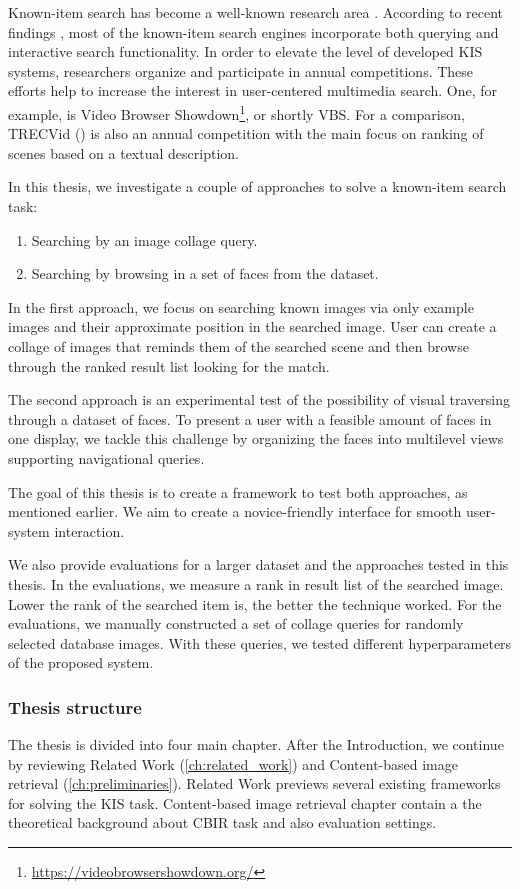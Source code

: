 Known-item search has become a well-known research area \cite{8352047}. According to recent findings \cite{9037125} , most of the known-item search engines incorporate both querying and interactive search functionality. In order to elevate the level of developed KIS systems, researchers organize and participate in annual competitions. These efforts help to increase the interest in user-centered multimedia search. One, for example, is Video Browser Showdown\footnote{\url{https://videobrowsershowdown.org/}}, or shortly VBS. For a comparison, TRECVid (\cite{2019trecvidawad}) is also an annual competition with the main focus on ranking of scenes based on a textual description.

In this thesis, we investigate a couple of approaches to solve a  known-item search task:

\begin{enumerate}
  \item Searching by an image collage query.
  \item Searching by browsing in a set of faces from the dataset.
\end{enumerate}

In the first approach, we focus on searching known images via only example images and their approximate position in the searched image. User can create a collage of images that reminds them of the searched scene and then browse through the ranked result list looking for the match.

The second approach is an experimental test of the possibility of visual traversing through a dataset of faces. To present a user with a feasible amount of faces in one display, we tackle this challenge by organizing the faces into multilevel views supporting navigational queries.

The goal of this thesis is to create a framework to test both approaches, as mentioned earlier. We aim to create a novice-friendly interface for smooth user-system interaction.

We also provide evaluations for a larger dataset and the approaches tested in this thesis. In the evaluations, we measure a rank in result list of the searched image. Lower the rank of the searched item is, the better the technique worked. For the evaluations, we manually constructed a set of collage queries for randomly selected database images. With these queries, we  tested different hyperparameters of the proposed system.

\subsubsection*{Thesis structure}
The thesis is divided into four main chapter. After the Introduction, we continue by reviewing Related Work (\autoref{ch:related_work}) and Content-based image retrieval (\autoref{ch:preliminaries}). Related Work previews several existing frameworks for solving the KIS task. Content-based image retrieval chapter contain a the theoretical background about CBIR task and also evaluation settings.

